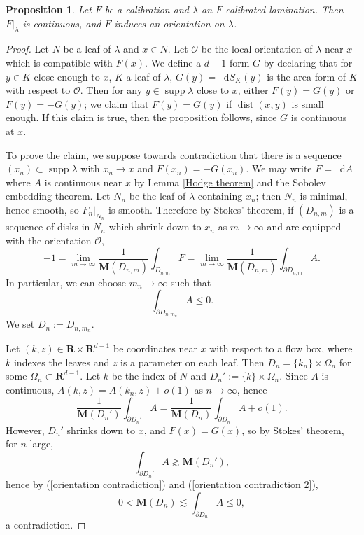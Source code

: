 \documentclass[reqno,11pt]{amsart}
\newcommand{\RR}{\mathbf{R}}
\newcommand*\dif{\mathop{}\!\mathrm{d}}
\DeclareMathOperator{\dist}{dist}
\DeclareMathOperator{\supp}{supp}
\newcommand{\Mass}{\mathbf M}
\newtheorem{proposition}[theorem]{Proposition}
\theoremstyle{definition}
\numberwithin{equation}{section}
\begin{document}
\begin{proposition}\label{calibrated implies oriented}
Let $F$ be a calibration and $\lambda$ an $F$-calibrated lamination.
Then $F|_\lambda$ is continuous, and $F$ induces an orientation on $\lambda$.
\end{proposition}
\begin{proof}
Let $N$ be a leaf of $\lambda$ and $x \in N$.
Let $\mathscr O$ be the local orientation of $\lambda$ near $x$ which is compatible with $F(x)$. 
We define a $d - 1$-form $G$ by declaring that for $y \in K$ close enough to $x$, $K$ a leaf of $\lambda$, $G(y) = \dif S_K(y)$ is the area form of $K$ with respect to $\mathscr O$.
Then for any $y \in \supp \lambda$ close to $x$, either $F(y) = G(y)$ or $F(y) = -G(y)$; we claim that $F(y) = G(y)$ if $\dist(x, y)$ is small enough.
If this claim is true, then the proposition follows, since $G$ is continuous at $x$.

To prove the claim, we suppose towards contradiction that there is a sequence $(x_n) \subset \supp \lambda$ with $x_n \to x$ and $F(x_n) = -G(x_n)$.
We may write $F = \dif A$ where $A$ is continuous near $x$ by Lemma \ref{Hodge theorem} and the Sobolev embedding theorem.
Let $N_n$ be the leaf of $\lambda$ containing $x_n$; then $N_n$ is minimal, hence smooth, so $F_n|_{N_n}$ is smooth.
Therefore by Stokes' theorem, if $(D_{n, m})$ is a sequence of disks in $N_n$ which shrink down to $x_n$ as $m \to \infty$ and are equipped with the orientation $\mathscr O$,
$$-1 = \lim_{m \to \infty} \frac{1}{\Mass(D_{n, m})} \int_{D_{n, m}} F = \lim_{m \to \infty} \frac{1}{\Mass(D_{n, m})} \int_{\partial D_{n, m}} A.$$
In particular, we can choose $m_n \to \infty$ such that 
\begin{equation}\label{orientation contradiction}
\int_{\partial D_{n, m_n}} A \leq 0.
\end{equation}
We set $D_n := D_{n, m_n}$.

Let $(k, z) \in \RR \times \RR^{d - 1}$ be coordinates near $x$ with respect to a flow box, where $k$ indexes the leaves and $z$ is a parameter on each leaf.
Then $D_n = \{k_n\} \times \Omega_n$ for some $\Omega_n \subset \RR^{d - 1}$.
Let $k$ be the index of $N$ and $D_n' := \{k\} \times \Omega_n$.
Since $A$ is continuous, $A(k, z) = A(k_n, z) + o(1)$ as $n \to \infty$, hence
\begin{equation}\label{orientation contradiction 2}
\frac{1}{\Mass(D_n')} \int_{\partial D_n'} A = \frac{1}{\Mass(D_n)} \int_{\partial D_n} A + o(1).
\end{equation}
However, $D_n'$ shrinks down to $x$, and $F(x) = G(x)$, so by Stokes' theorem, for $n$ large,
$$\int_{\partial D_n'} A \gtrsim \Mass(D_n'),$$
hence by (\ref{orientation contradiction}) and (\ref{orientation contradiction 2}),
$$0 < \Mass(D_n) \lesssim \int_{\partial D_n} A \leq 0,$$
a contradiction.
\end{proof}
\end{document}

